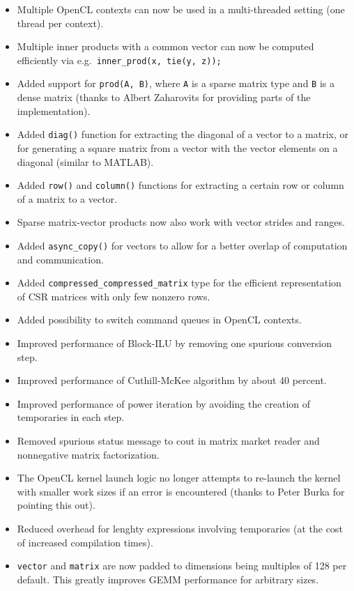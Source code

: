 \begin{itemize}
 \item Multiple OpenCL contexts can now be used in a multi-threaded setting (one thread per context).
 \item Multiple inner products with a common vector can now be computed efficiently via e.g.~\lstinline|inner_prod(x, tie(y, z));|
 \item Added support for \lstinline|prod(A, B)|, where \lstinline|A| is a sparse matrix type and \lstinline|B| is a dense matrix (thanks to Albert Zaharovits for providing parts of the implementation).
 \item Added \lstinline|diag()| function for extracting the diagonal of a vector to a matrix, or for generating a square matrix from a vector with the vector elements on a diagonal (similar to MATLAB).
 \item Added \lstinline|row()| and \lstinline|column()| functions for extracting a certain row or column of a matrix to a vector.
 \item Sparse matrix-vector products now also work with vector strides and ranges.
 \item Added \lstinline|async_copy()| for vectors to allow for a better overlap of computation and communication.
 \item Added \lstinline|compressed_compressed_matrix| type for the efficient representation of CSR matrices with only few nonzero rows.
 \item Added possibility to switch command queues in OpenCL contexts.
 \item Improved performance of Block-ILU by removing one spurious conversion step.
 \item Improved performance of Cuthill-McKee algorithm by about 40 percent.
 \item Improved performance of power iteration by avoiding the creation of temporaries in each step.
 \item Removed spurious status message to cout in matrix market reader and nonnegative matrix factorization.
 \item The OpenCL kernel launch logic no longer attempts to re-launch the kernel with smaller work sizes if an error is encountered (thanks to Peter Burka for pointing this out).
 \item Reduced overhead for lenghty expressions involving temporaries (at the cost of increased compilation times).
 \item \lstinline|vector| and \lstinline|matrix| are now padded to dimensions being multiples of 128 per default. This greatly improves GEMM performance for arbitrary sizes.

\end{itemize}
